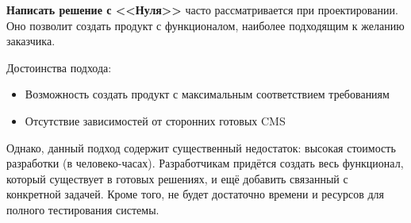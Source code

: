 \documentclass[a4paper,14pt]{article}
\begin{document}
\textbf{Написать решение с <<Нуля>>} часто рассматривается при проектировании.
Оно позволит создать продукт с функционалом, наиболее подходящим к желанию заказчика.

Достоинства подхода:

\begin{itemize}
	\item Возможность создать продукт с максимальным соответствием требованиям
	\item Отсутствие зависимостей от сторонних готовых CMS 
\end{itemize}

Однако, данный подход содержит существенный недостаток: высокая стоимость разработки (в человеко-часах).
Разработчикам придётся создать весь функционал, который существует в готовых решениях,  и ещё добавить связанный с конкретной задачей.
Кроме того, не будет достаточно времени и ресурсов для полного тестирования системы.



\end{document}
